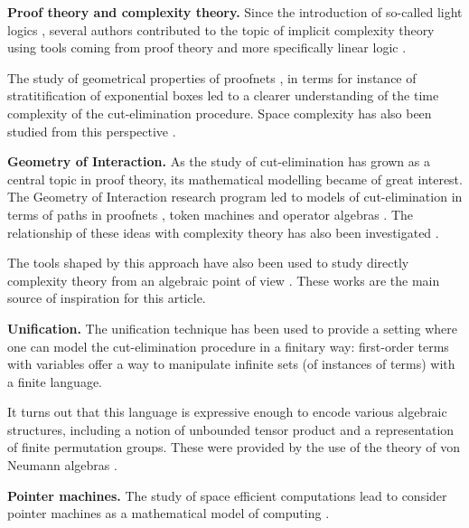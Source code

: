 \textbf{Proof theory and complexity theory.} Since the introduction of so-called light logics \cite{girard_light_1994}, several authors contributed to the topic of implicit complexity theory using tools coming from proof theory and more specifically linear logic \cite{girard_linear_1987}.

The study of geometrical properties of proofnets \cite{girard_linear_1987}, in terms for instance of stratitification of exponential boxes \cite{baillot_linear_2010} led to a clearer understanding of the time complexity of the cut-elimination procedure. Space complexity has also been studied from this perspective \cite{schopp_stratified_2007,gaboardi_logical_2008}.

\smallskip\noindent
\textbf{Geometry of Interaction.} As the study of cut-elimination has grown as a central topic in proof theory, its mathematical modelling became of great interest. The Geometry of Interaction \cite{girard_towards_1989} research program led to models of cut-elimination in terms of paths in proofnets \cite{asperti_paths_1994}, token machines \cite{laurent_token_2001} and operator algebras \cite{girard_geometry_1989}.
The relationship of these ideas with complexity theory has also been investigated \cite{schopp_space-efficient_2006,baillot_elementary_2001}.

The tools shaped by this approach have also been used to study directly complexity theory from an algebraic point of view \cite{girard_normativity_2012,aubert_characterizing_2012,seiller_logarithmic_2013}. These works are the main source of inspiration for this article.

\smallskip\noindent
\textbf{Unification.} The unification technique has been used \cite{girard_geometry_1995,baillot_elementary_2001,girard_three_lightings} to provide a setting where one can model the cut-elimination procedure in a finitary way: first-order terms with variables offer a way to manipulate infinite sets (of instances of terms) with a finite language.

It turns out that this language is expressive enough to encode various algebraic structures, including a notion of unbounded tensor product and a representation of finite permutation groups. These were provided by the use of the theory of von Neumann algebras \cite{girard_normativity_2012,aubert_characterizing_2012,seiller_logarithmic_2013}.

\smallskip\noindent
\textbf{Pointer machines.} The study of space efficient computations lead to consider pointer machines as a mathematical model of computing \cite{hofmann_pointer_2009}.%

